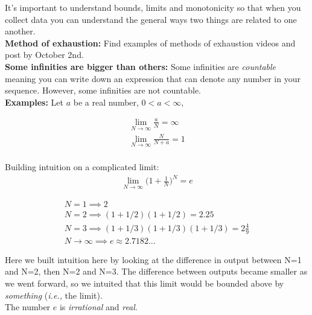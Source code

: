 \documentclass{article}
\begin{document}
It's important to understand bounds, limits and monotonicity so that when you collect data you can understand the general ways two things are related to one another. \\


\textbf{Method of exhaustion:} Find examples of methods of exhaustion videos and post by October 2nd. \\

\textbf{Some infinities are bigger than others:} Some infinities are \textit{countable} meaning you can write down an expression that can denote any number in your sequence. However, some infinities are not countable. \\

\textbf{Examples:}
Let $a$ be a real number, $0<a<\infty$,

\begin{align*}
    \lim_{N\to\infty} \frac{a}{N} = \infty\\
    \lim_{N\to\infty} \frac{N}{N+a} = 1\\
\end{align*}

Building intuition on a complicated limit: 
\begin{align*}
    \lim_{N \to \infty} \Bigg(1+ \frac{1}{N}\Bigg)^N  = e
\end{align*}

\begin{align*}
    N = 1 \implies 2 \\
    N = 2 \implies (1+1/2)(1+1/2) = 2.25\\
    N = 3 \implies (1+1/3)(1+1/3)(1+1/3) = 2\frac{4}{9}\\
    N \rightarrow \infty \implies e \approx 2.7182...
\end{align*}

Here we built intuition here by looking at the difference in output between N=1 and N=2, then N=2 and N=3. The difference between outputs became smaller as we went forward, so we intuited that this limit would be bounded above by \textit{something} (\textit{i.e.,} the limit). \\

The number $e$ is \textit{irrational} and \textit{real}.
\end{document}
